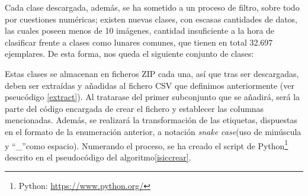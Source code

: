 Cada clase descargada, además, se ha sometido a un proceso de filtro, sobre todo por cuestiones numéricas; existen nuevas clases, con escasas cantidades de datos, las cuales poseen menos de 10 imágenes, cantidad insuficiente a la hora de clasificar frente a clases como lunares comunes, que tienen en total 32.697 ejemplares. De esta forma, nos queda el siguiente conjunto de clases:

Estas clases se almacenan en ficheros ZIP cada una, así que tras ser descargadas, deben ser extraídas y añadidas al fichero CSV que definimos anteriormente (ver pseucódigo \ref{extract}). Al tratarase del primer subconjunto que se añadirá, será la parte del código encargada de crear el fichero y establecer las columnas mencionadas. Además, se realizará la transformación de las etiquetas, dispuestas en el formato de la enumeración anterior, a notación \textit{snake case}(uso de minúscula y ``\_''como espacio). Numerando el proceso, se ha creado el script de Python\footnote{Python: \url{https://www.python.org/}} descrito en el pseudocódigo del algoritmo\ref{isiccrear}.


